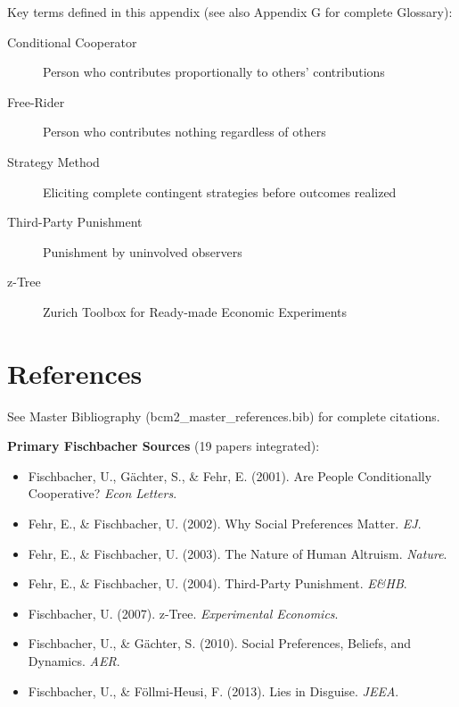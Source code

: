 Key terms defined in this appendix (see also Appendix G for complete Glossary):

\begin{description}
    \item[Conditional Cooperator] Person who contributes proportionally to others' contributions
    \item[Free-Rider] Person who contributes nothing regardless of others
    \item[Strategy Method] Eliciting complete contingent strategies before outcomes realized
    \item[Third-Party Punishment] Punishment by uninvolved observers
    \item[z-Tree] Zurich Toolbox for Ready-made Economic Experiments
\end{description}

\section{References}

See Master Bibliography (bcm2\_master\_references.bib) for complete citations.

\nocite{bcm_master}

\textbf{Primary Fischbacher Sources} (19 papers integrated):

\begin{itemize}
    \item Fischbacher, U., Gächter, S., \& Fehr, E. (2001). Are People Conditionally Cooperative? \textit{Econ Letters}.
    \item Fehr, E., \& Fischbacher, U. (2002). Why Social Preferences Matter. \textit{EJ}.
    \item Fehr, E., \& Fischbacher, U. (2003). The Nature of Human Altruism. \textit{Nature}.
    \item Fehr, E., \& Fischbacher, U. (2004). Third-Party Punishment. \textit{E\&HB}.
    \item Fischbacher, U. (2007). z-Tree. \textit{Experimental Economics}.
    \item Fischbacher, U., \& Gächter, S. (2010). Social Preferences, Beliefs, and Dynamics. \textit{AER}.
    \item Fischbacher, U., \& Föllmi-Heusi, F. (2013). Lies in Disguise. \textit{JEEA}.
\end{itemize}


